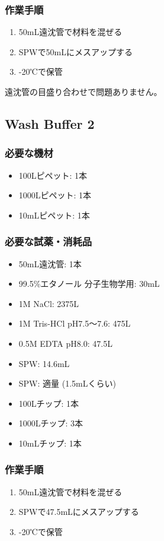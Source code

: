 \documentclass[titlepage,10pt,a4paper,uplatex]{jsbook}
\begin{document}
\subsubsection{作業手順}
\begin{enumerate}
\item 50mL遠沈管で材料を混ぜる
\item SPWで50mLにメスアップする
\item -20℃で保管
\end{enumerate}

遠沈管の目盛り合わせで問題ありません。

\subsection{Wash Buffer 2}

\subsubsection{必要な機材}
\begin{itemize}
\item 100{\textmu}Lピペット: 1本
\item 1000{\textmu}Lピペット: 1本
\item 10mLピペット: 1本
\end{itemize}

\subsubsection{必要な試薬・消耗品}
\begin{itemize}
\item 50mL遠沈管: 1本
\item 99.5\%エタノール 分子生物学用: 30mL
\item 1M NaCl: 2375{\textmu}L
\item 1M Tris-HCl pH7.5～7.6: 475{\textmu}L
\item 0.5M EDTA pH8.0: 47.5{\textmu}L
\item SPW: 14.6mL
\item SPW: 適量 (1.5mLくらい)
\item 100{\textmu}Lチップ: 1本
\item 1000{\textmu}Lチップ: 3本
\item 10mLチップ: 1本
\end{itemize}

\subsubsection{作業手順}
\begin{enumerate}
\item 50mL遠沈管で材料を混ぜる
\item SPWで47.5mLにメスアップする
\item -20℃で保管
\end{enumerate}
\end{document}
